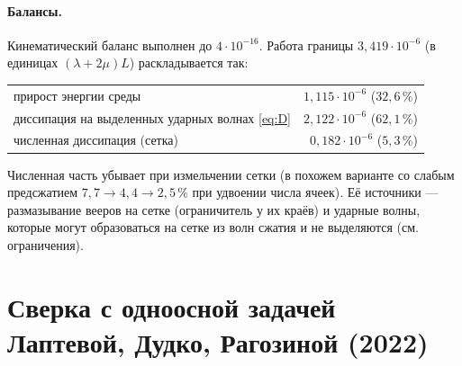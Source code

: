 \documentclass[11pt,a4paper]{article}
\theoremstyle{definition}
\theoremstyle{remark}
\begin{document}
\paragraph{Балансы.} Кинематический баланс выполнен до $4\cdot10^{-16}$. Работа границы
$3{,}419\cdot10^{-6}$ (в единицах $(\lambda+2\mu)L$) раскладывается так:
\begin{center}
\begin{tabular}{lr}
\toprule
прирост энергии среды & $1{,}115\cdot10^{-6}$ ($32{,}6\,\%$)\\
диссипация на выделенных ударных волнах \eqref{eq:D} & $2{,}122\cdot10^{-6}$ ($62{,}1\,\%$)\\
численная диссипация (сетка) & $0{,}182\cdot10^{-6}$ ($5{,}3\,\%$)\\
\bottomrule
\end{tabular}
\end{center}
Численная часть убывает при измельчении сетки (в похожем варианте со слабым предсжатием
$7{,}7\to4{,}4\to2{,}5\,\%$ при удвоении числа ячеек). Её источники --- размазывание вееров на сетке
(ограничитель у их краёв) и ударные волны, которые могут образоваться на сетке из волн сжатия и не
выделяются (см. ограничения).

\section{Сверка с одноосной задачей Лаптевой, Дудко, Рагозиной (2022)}\label{sec:uniaxial}
\end{document}

